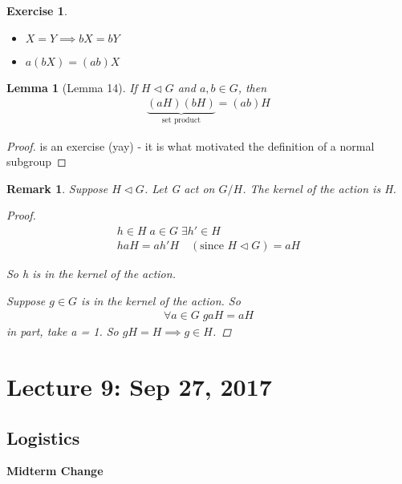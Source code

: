 \documentclass[11pt, oneside]{book}
\theoremstyle{break}
\newtheorem*{proof}{Proof}
\newtheorem{lemma}{Lemma}[section]
\newtheorem*{remark}{Remark}
\newtheorem{ex}{Exercise}[section]
\begin{document}
\begin{ex}
    \begin{itemize}
        \item $X = Y \implies bX = bY$
        \item $a(bX) = (ab)X$
    \end{itemize}
\end{ex}

\begin{lemma}[Lemma 14]\label{lemma:14}
    If $H \triangleleft G$ and $a, b \in G$, then
    \begin{align}
        \underbrace{(aH)(bH)}_{\text{set product}} = (ab)H
    \end{align}
\end{lemma}

\begin{proof}
    is an exercise (yay) - it is what motivated the definition of a normal subgroup
\end{proof}

\begin{remark}
    Suppose $H \triangleleft G$. Let G act on $G/H$. The kernel of the action is H.

    \begin{proof}
        \begin{gather*}
            h \in H \; a \in G \; \exists h' \in H \\
            haH = ah'H \quad (\text{since $H \triangleleft G$}) = aH
        \end{gather*}

        So h is in the kernel of the action.

        Suppose $g \in G$ is in the kernel of the action. So
        \begin{gather*}
            \forall a \in G \; gaH = aH
        \end{gather*}
        in part, take a = 1. So $gH = H \implies g \in H$.
    \end{proof}
\end{remark}

\chapter{Lecture 9: Sep 27, 2017}\label{chp:lec9}

\section{Logistics}

\textbf{Midterm Change}
\end{document}
